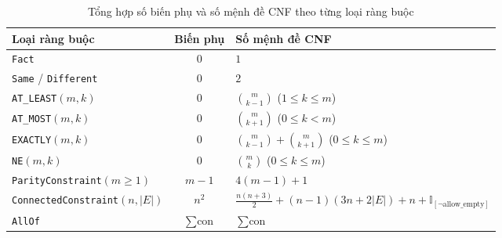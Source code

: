\begin{table}[htbp]
    \centering
    \caption{Tổng hợp số biến phụ và số mệnh đề CNF theo từng loại ràng buộc}
    \label{tab:cnf_encoding_summary}
    \begin{tabularx}{\textwidth}{l c X}
        \toprule
        \textbf{Loại ràng buộc} & \textbf{Biến phụ} & \textbf{Số mệnh đề CNF} \\
        \midrule
        \texttt{Fact} & $0$ & $1$ \\
        \texttt{Same} / \texttt{Different} & $0$ & $2$ \\
        \texttt{AT\_LEAST}$(m, k)$ & $0$ & $\binom{m}{k-1}$ \quad ($1 \le k \le m$) \\
        \texttt{AT\_MOST}$(m, k)$ & $0$ & $\binom{m}{k+1}$ \quad ($0 \le k < m$) \\
        \texttt{EXACTLY}$(m, k)$ & $0$ & $\binom{m}{k-1} + \binom{m}{k+1}$ \quad ($0 \le k \le m$) \\
        \texttt{NE}$(m, k)$ & $0$ & $\binom{m}{k}$ \quad ($0 \le k \le m$) \\
        \texttt{ParityConstraint}$(m \ge 1)$ & $m - 1$ & $4(m - 1) + 1$ \\
        \texttt{ConnectedConstraint}$(n, |E|)$ & $n^2$ & $\frac{n(n+3)}{2} + (n - 1)(3n + 2|E|) + n + \mathbb{I}_{[\neg\text{allow\_empty}]}$ \\
        \texttt{AllOf} & $\sum \text{con}$ & $\sum \text{con}$ \\
        \bottomrule
    \end{tabularx}
\end{table}

